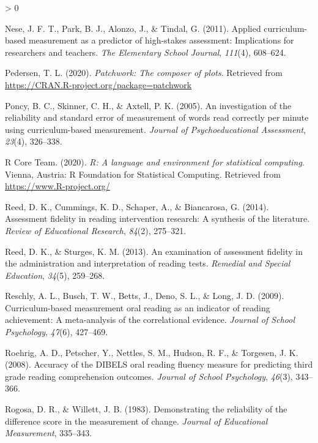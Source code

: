 \documentclass[
  english,
  man, fleqn, noextraspace]{apa6}
\newlength{\cslhangindent}
\newenvironment{CSLReferences}[2] %
 {%
  \setlength{\parindent}{0pt}
  \ifodd #1 \everypar{\setlength{\hangindent}{\cslhangindent}}\ignorespaces\fi
  \ifnum #2 > 0
  \setlength{\parskip}{#2\baselineskip}
  \fi
 }%
 {}
\begin{document}
\begin{CSLReferences}{1}{0}
\leavevmode\hypertarget{ref-nese2011}{}%
Nese, J. F. T., Park, B. J., Alonzo, J., \& Tindal, G. (2011). Applied curriculum-based measurement as a predictor of high-stakes assessment: Implications for researchers and teachers. \emph{The Elementary School Journal}, \emph{111}(4), 608--624.

\leavevmode\hypertarget{ref-R-patchwork}{}%
Pedersen, T. L. (2020). \emph{Patchwork: The composer of plots}. Retrieved from \url{https://CRAN.R-project.org/package=patchwork}

\leavevmode\hypertarget{ref-poncy2005}{}%
Poncy, B. C., Skinner, C. H., \& Axtell, P. K. (2005). An investigation of the reliability and standard error of measurement of words read correctly per minute using curriculum-based measurement. \emph{Journal of Psychoeducational Assessment}, \emph{23}(4), 326--338.

\leavevmode\hypertarget{ref-R-base}{}%
R Core Team. (2020). \emph{R: A language and environment for statistical computing}. Vienna, Austria: R Foundation for Statistical Computing. Retrieved from \url{https://www.R-project.org/}

\leavevmode\hypertarget{ref-reed2014}{}%
Reed, D. K., Cummings, K. D., Schaper, A., \& Biancarosa, G. (2014). Assessment fidelity in reading intervention research: A synthesis of the literature. \emph{Review of Educational Research}, \emph{84}(2), 275--321.

\leavevmode\hypertarget{ref-reed2013}{}%
Reed, D. K., \& Sturges, K. M. (2013). An examination of assessment fidelity in the administration and interpretation of reading tests. \emph{Remedial and Special Education}, \emph{34}(5), 259--268.

\leavevmode\hypertarget{ref-reschly2009}{}%
Reschly, A. L., Busch, T. W., Betts, J., Deno, S. L., \& Long, J. D. (2009). Curriculum-based measurement oral reading as an indicator of reading achievement: A meta-analysis of the correlational evidence. \emph{Journal of School Psychology}, \emph{47}(6), 427--469.

\leavevmode\hypertarget{ref-roehrig2008}{}%
Roehrig, A. D., Petscher, Y., Nettles, S. M., Hudson, R. F., \& Torgesen, J. K. (2008). Accuracy of the DIBELS oral reading fluency measure for predicting third grade reading comprehension outcomes. \emph{Journal of School Psychology}, \emph{46}(3), 343--366.

\leavevmode\hypertarget{ref-rogosaetal1983}{}%
Rogosa, D. R., \& Willett, J. B. (1983). Demonstrating the reliability of the difference score in the measurement of change. \emph{Journal of Educational Measurement}, 335--343.


\end{CSLReferences}
\end{document}
